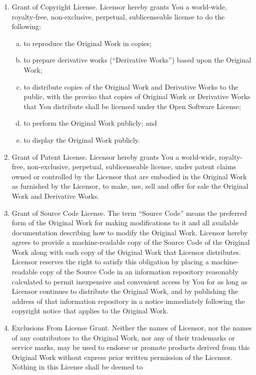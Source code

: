 \documentclass[11pt]{book}
\begin{document}
\begin{enumerate}[1)]
\item
Grant of Copyright License. Licensor hereby grants You a world-wide,
royalty-free, non-exclusive, perpetual, sublicenseable license to do
the following:
\begin{enumerate}[a)]
\item
to reproduce the Original Work in copies;
\item
to prepare derivative works (``Derivative Works'') based upon the
Original Work;
\item
to distribute copies of the Original Work and Derivative Works to the
public, with the proviso that copies of Original Work or Derivative
Works that You distribute shall be licensed under the Open Software
License;
\item
to perform the Original Work publicly; and
\item
to display the Original Work publicly.
\end{enumerate}
\item
Grant of Patent License. Licensor hereby grants You a world-wide,
royalty-free, non-exclusive, perpetual, sublicenseable license, under
patent claims owned or controlled by the Licensor that are embodied in
the Original Work as furnished by the Licensor, to make, use, sell and
offer for sale the Original Work and Derivative Works.
\item
Grant of Source Code License. The term ``Source Code'' means the
preferred form of the Original Work for making modifications to it and
all available documentation describing how to modify the Original
Work. Licensor hereby agrees to provide a machine-readable copy of the
Source Code of the Original Work along with each copy of the Original
Work that Licensor distributes. Licensor reserves the right to satisfy
this obligation by placing a machine-readable copy of the Source Code
in an information repository reasonably calculated to permit
inexpensive and convenient access by You for as long as Licensor
continues to distribute the Original Work, and by publishing the
address of that information repository in a notice immediately
following the copyright notice that applies to the Original Work.
\item
Exclusions From License Grant. Neither the names of Licensor, nor the
names of any contributors to the Original Work, nor any of their
trademarks or service marks, may be used to endorse or promote
products derived from this Original Work without express prior written
permission of the Licensor. Nothing in this License shall be deemed to

\end{enumerate}
\end{document}
